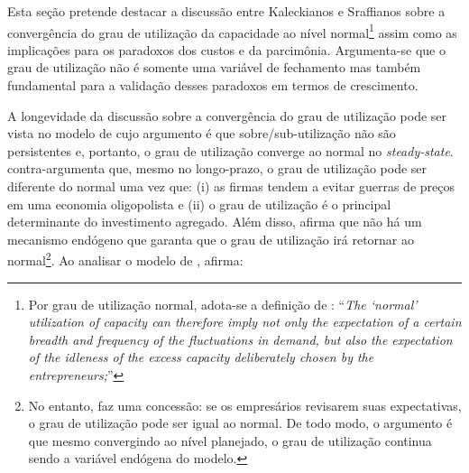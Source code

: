 

Esta seção pretende destacar a discussão entre Kaleckianos e Sraffianos sobre a convergência do grau de utilização da capacidade ao nível normal\footnote{Por grau de utilização normal, adota-se a definição de \textcites[p.~423--4, Original de 1986]{ciccone_2017}: ``\textit{The `normal' utilization of capacity can therefore imply not only the expectation of a certain breadth and frequency of the fluctuations in demand, but also the expectation of the idleness of the excess capacity deliberately chosen by the entrepreneurs;}'' } assim como as implicações para os paradoxos dos custos e da parcimônia. 
Argumenta-se que o grau de utilização não é somente uma variável de fechamento mas também fundamental para a validação desses paradoxos em termos de crescimento. 

A longevidade da discussão sobre a convergência do grau de utilização pode ser vista no modelo de \textcite{vianello_pace_1985} cujo argumento é que sobre/sub-utilização não são persistentes e, portanto, o grau de utilização converge ao normal no \textit{steady-state}. \textcite{amadeo_role_1986} contra-argumenta que, mesmo no longo-prazo, o grau de utilização pode ser diferente do normal uma vez que: (i) as firmas tendem a evitar guerras de preços em uma economia oligopolista e (ii) o grau de utilização é o principal determinante do investimento agregado. Além disso, afirma que não há um mecanismo endógeno que garanta que o grau de utilização irá retornar ao normal\footnote{No entanto, faz uma concessão: se os empresários revisarem suas expectativas, o grau de utilização pode ser igual ao normal. De todo modo, o argumento é que mesmo convergindo ao nível planejado, o grau de utilização continua sendo a variável endógena do modelo.}. Ao analisar o modelo de \textcites[Original de 1986]{ciccone_2017}, afirma:

